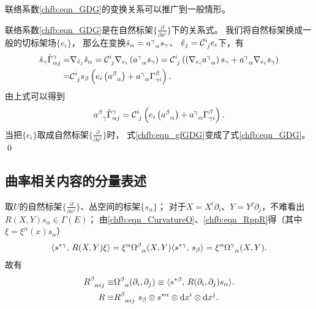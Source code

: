 

\begin{example}
	联络系数\eqref{chfb:eqn_GDG}的变换关系可以推广到一般情形。
\end{example}
联络系数\eqref{chfb:eqn_GDG}是在自然标架$\{\frac{\partial }{\partial x^i}\}$下的关系式。
我们将自然标架换成一般的切标架场$\{e_i\}$，
那么在变换$\tilde{s}_\alpha=a_{\hphantom{\alpha}\alpha}^\gamma s_\gamma$、
$\tilde{e}_j=\mathcal{C}_{\hphantom{i}j}^i e_i$下，有
\begin{align*}
	\tilde{s}_\gamma \tilde{\Gamma}^\gamma_{\alpha j}
	=&  \nabla_{\tilde{e}_j} \tilde{s}_\alpha 
	= \mathcal{C}_{\hphantom{i}j}^i \nabla_{e_i} \left(a_{\hphantom{\alpha}\alpha}^\gamma s_\gamma\right)
	= \mathcal{C}_{\hphantom{i}j}^i \left( \left(\nabla_{e_i} a_{\hphantom{\alpha}\alpha}^\gamma\right) s_\gamma
	+ a_{\hphantom{\alpha}\alpha}^\gamma  \nabla_{e_i} s_\gamma\right) \\
	=& \mathcal{C}_{\hphantom{i}j}^i s_\beta \left({e_i}\left( a_{\hphantom{\alpha}\alpha}^\beta\right) 
	+ a_{\hphantom{\alpha}\alpha}^\gamma \Gamma_{\gamma i}^\beta \right) .
\end{align*}
由上式可以得到
\begin{equation}\label{chfb:eqn_gfGDG}
	a_{\hphantom{\alpha}\gamma}^\beta \tilde{\Gamma}^\gamma_{\alpha j} = \mathcal{C}_{\hphantom{i}j}^i 
	\left({e_i}\left( a_{\hphantom{\alpha}\alpha}^\beta\right) 
	+ a_{\hphantom{\alpha}\alpha}^\gamma \Gamma_{\gamma i}^\beta \right) .
\end{equation}
当把$\{e_i\}$取成自然标架$\{\frac{\partial }{\partial x^i}\}$时，
式\eqref{chfb:eqn_gfGDG}变成了式\eqref{chfb:eqn_GDG}。
\qed








\subsection{曲率相关内容的分量表述}

取$U$的自然标架$\{\frac{\partial }{\partial x^i}\}$、丛空间的标架$\{s_\alpha\}$；
对于$X=X^i \partial_i$、$Y=Y^j \partial_j$，不难看出$R(X, Y) s_\alpha \in \Gamma(E)$；
由\eqref{chfb:eqn_CurvatureO}、\eqref{chfb:eqn_RppR}得（其中$\xi = \xi^\alpha(x) s_{\alpha}$）
\begin{align*}
	\langle s^{*\gamma},\,  R(X, Y) \xi \rangle
	=\xi^\alpha \Omega_{\hphantom{\alpha}\alpha}^\beta(X, Y) \langle s^{*\gamma},\,  s_{\beta}\rangle 
	=\xi^\alpha \Omega_{\hphantom{\alpha}\alpha}^\gamma (X, Y) .
\end{align*}
故有
\begin{subequations}\label{chfb:eqn_R-comp}
	\begin{align}
	R_{\hphantom{\alpha}\alpha i j}^\beta \equiv&
	\Omega_{\hphantom{\alpha}\alpha}^\beta (\partial_i, \partial_j) \equiv	\langle s^{*\beta},\,  
	R(\partial_i, \partial_j) s_\alpha \rangle .  \label{chfb:eqn_R-comp-1} \\
	R \equiv& R_{\hphantom{\alpha}\alpha i j}^\beta \ s_\beta \otimes 
	s^{*\alpha}\otimes {\rm d}x^i \otimes {\rm d}x^j . \label{chfb:eqn_R-comp-2}
	\end{align}
\end{subequations}

